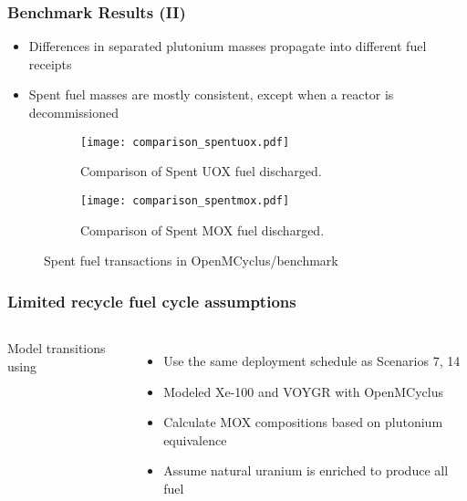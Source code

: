 \begin{frame}
    \frametitle{Benchmark Results (II)}
        \begin{itemize}
            \item Differences in separated plutonium masses 
                  propagate into different fuel receipts 
            \item Spent fuel masses are mostly consistent, except 
                  when a reactor is decommissioned
        \end{itemize}
        \begin{figure}
            \centering
            \begin{subfigure}{0.48\textwidth}
                \texttt{[image: comparison\_spentuox.pdf]}
                \caption{Comparison of Spent UOX fuel discharged.}
            \end{subfigure}
            \hfill
            \begin{subfigure}{0.48\textwidth}
                \texttt{[image: comparison\_spentmox.pdf]}
                \caption{Comparison of Spent MOX fuel discharged.}
            \end{subfigure}
            \caption{Spent fuel transactions in OpenMCyclus/\Cycamore benchmark}
            \label{fig:spentfuel_benchmark}
        \end{figure}

\end{frame}


\begin{frame}
    \frametitle{Limited recycle fuel cycle assumptions}
    \begin{columns}
        
    \column[t]{6cm}
    \vspace{-0.9cm}
    

        \column[t]{4.5cm}
        Model transitions using \Cyclus \cite{huff_fundamental_2016}
        \begin{itemize}
            \item Use the same deployment schedule as Scenarios 7, 14
            \item<2-> Modeled Xe-100 and VOYGR with OpenMCyclus
            \item<2-> Calculate MOX compositions based on plutonium
                      equivalence
            \item<3-> Assume natural uranium is enriched to produce all 
                  fuel
        \end{itemize}

\end{columns}
\end{frame}

